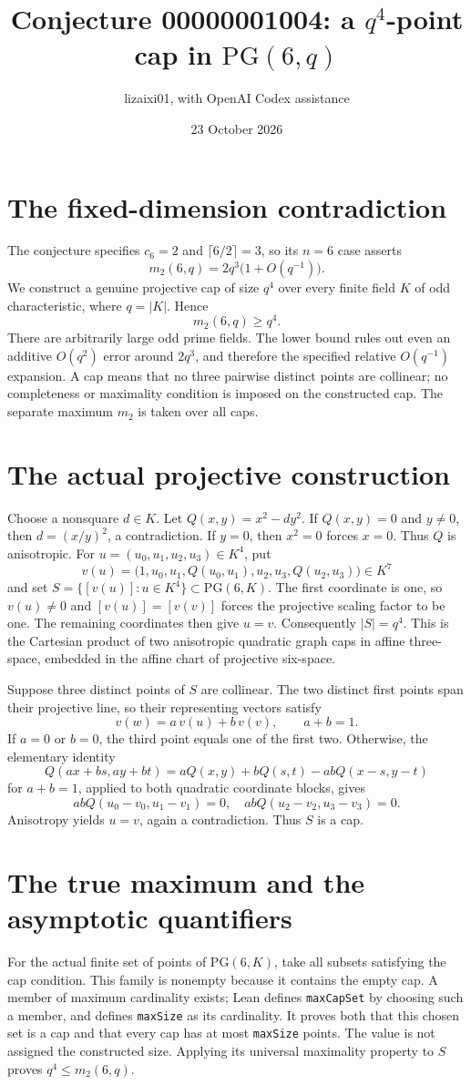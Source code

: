 \documentclass[11pt]{article}
\title{Conjecture 00000001004: a $q^4$-point cap in $\mathrm{PG}(6,q)$}
\author{lizaixi01, with OpenAI Codex assistance}
\date{23 October 2026}
\begin{document}
\maketitle
\section{The fixed-dimension contradiction}
The conjecture specifies $c_6=2$ and $\lceil6/2\rceil=3$, so its
$n=6$ case asserts
\[
 m_2(6,q)=2q^3\bigl(1+O(q^{-1})\bigr).
\]
We construct a genuine projective cap of size $q^4$ over every finite
field $K$ of odd characteristic, where $q=|K|$. Hence
\[
 m_2(6,q)\ge q^4.
\]
There are arbitrarily large odd prime fields. The lower bound rules
out even an additive $O(q^2)$ error around $2q^3$, and therefore the
specified relative $O(q^{-1})$ expansion. A cap means that no three
pairwise distinct points are collinear; no completeness or maximality
condition is imposed on the constructed cap. The separate maximum
$m_2$ is taken over all caps.

\section{The actual projective construction}
Choose a nonsquare $d\in K$. Let $Q(x,y)=x^2-dy^2$.
If $Q(x,y)=0$ and $y\ne0$, then $d=(x/y)^2$, a contradiction.
If $y=0$, then $x^2=0$ forces $x=0$. Thus $Q$ is anisotropic.
For $u=(u_0,u_1,u_2,u_3)\in K^4$, put
\[
 v(u)=\bigl(1,u_0,u_1,Q(u_0,u_1),u_2,u_3,Q(u_2,u_3)\bigr)\in K^7
\]
and set $S=\{[v(u)]:u\in K^4\}\subset\mathrm{PG}(6,K)$.
The first coordinate is one, so $v(u)\ne0$ and
$[v(u)]=[v(v)]$ forces the projective scaling factor to be one.
The remaining coordinates then give $u=v$. Consequently $|S|=q^4$.
This is the Cartesian product of two anisotropic quadratic graph caps
in affine three-space, embedded in the affine chart of projective
six-space.

Suppose three distinct points of $S$ are collinear. The two distinct
first points span their projective line, so their representing
vectors satisfy
\[
 v(w)=a\,v(u)+b\,v(v),\qquad a+b=1.
\]
If $a=0$ or $b=0$, the third point equals one of the first two.
Otherwise, the elementary identity
\[
 Q(ax+bs,ay+bt)=aQ(x,y)+bQ(s,t)-abQ(x-s,y-t)
\]
for $a+b=1$, applied to both quadratic coordinate blocks, gives
\[
 abQ(u_0-v_0,u_1-v_1)=0,
 \quad abQ(u_2-v_2,u_3-v_3)=0.
\]
Anisotropy yields $u=v$, again a contradiction. Thus $S$ is a cap.

\newpage
\section{The true maximum and the asymptotic quantifiers}
For the actual finite set of points of $\mathrm{PG}(6,K)$, take all
subsets satisfying the cap condition. This family is nonempty because
it contains the empty cap. A member of maximum cardinality exists;
Lean defines \texttt{maxCapSet} by choosing such a member, and defines
\texttt{maxSize} as its cardinality. It proves both that this chosen
set is a cap and that every cap has at most \texttt{maxSize} points.
The value is not assigned the constructed size. Applying its universal
maximality property to $S$ proves $q^4\le m_2(6,q)$.
\end{document}
